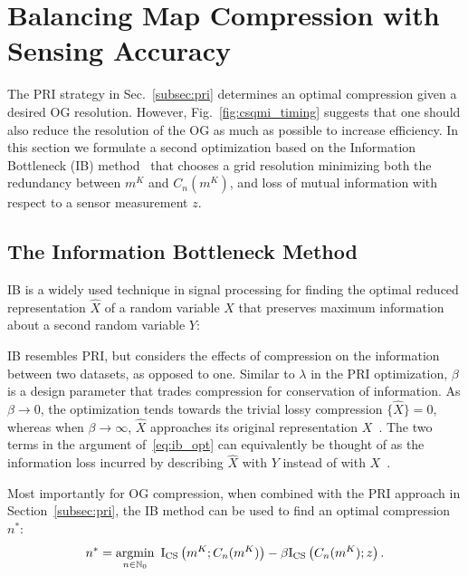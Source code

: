 \chapter{Balancing Map Compression with Sensing Accuracy}
\label{chapter4}

The PRI strategy in Sec.~\ref{subsec:pri} determines an optimal compression given a desired OG resolution. However, Fig.~\ref{fig:csqmi_timing} suggests that one should also reduce the resolution of the OG as much as possible to increase efficiency. In this section we formulate a second optimization based on the Information Bottleneck (IB) method~\cite{tishby2000information} that chooses a grid resolution minimizing both the redundancy between $m^{K}$ and
$C_{n}(m^{K})$, and loss of mutual information with respect to a sensor measurement $z$.


\section{The Information Bottleneck Method}

IB is a widely used technique in signal processing for finding the optimal reduced representation $\hat{X}$ of a random variable $X$ that preserves maximum information about a second random variable $Y$:
%

IB resembles PRI, but considers the effects of compression on the information between two datasets, as opposed to one. Similar to $\lambda$ in the PRI optimization, $\beta$ is a design parameter that trades compression for conservation of information. As $\beta \rightarrow 0$, the optimization tends towards the trivial lossy compression $\{\hat{X}\}=0$, whereas when $\beta \rightarrow \infty$, $\hat{X}$ approaches its original representation $X$~\cite{principe2010information}. The two terms in the argument of~\eqref{eq:ib_opt} can equivalently be thought of as the information loss incurred by describing $\hat{X}$ with $Y$ instead of with $X$~\cite{geiger2011information}.

Most importantly for OG compression, when combined with the PRI approach in Section~\ref{subsec:pri}, the IB method can be used to find an optimal compression $n^{*}$:
%
\begin{gather}
    n^{*}
    =
    \argmin_{
        n \in \mbb{N}_{0}
    } \, \,
    \text{I}_{\text{CS}}\left(m^{K}; C_{n}(m^{K})\right)
    -
    \beta
    \text{I}_{\text{CS}}\left(C_{n}(m^{K}); z\right).
    \label{eq:ib_arg_opt}
\end{gather}

